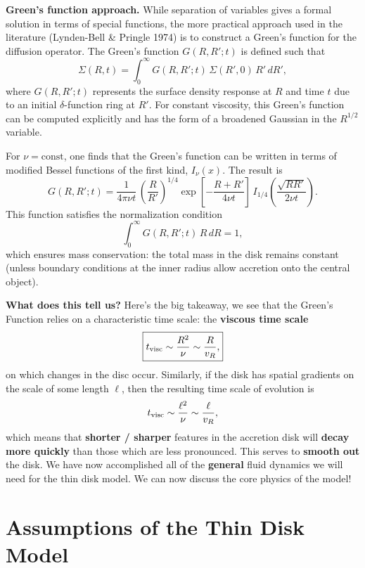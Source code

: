\vspace{0.25cm}
\noindent
\textbf{Green's function approach.} \;
While separation of variables gives a formal solution in terms of special functions, the more practical approach used in the literature (Lynden-Bell \& Pringle 1974) is to construct a Green's function for the diffusion operator. The Green's function $G(R,R';t)$ is defined such that
\[
\Sigma(R,t) = \int_0^\infty G(R,R';t)\,\Sigma(R',0)\, R'\,dR',
\]
where $G(R,R';t)$ represents the surface density response at $R$ and time $t$ due to an initial $\delta$-function ring at $R'$. For constant viscosity, this Green's function can be computed explicitly and has the form of a broadened Gaussian in the $R^{1/2}$ variable.
\par
For $\nu=\text{const}$, one finds that the Green's function can be written in terms of modified Bessel functions of the first kind, $I_\nu(x)$. The result is
\begin{equation}
    G(R,R';t) = \frac{1}{4\pi \nu t}\,
    \left(\frac{R}{R'}\right)^{1/4}
    \exp\!\left[-\frac{R+R'}{4\nu t}\right]\,
    I_{1/4}\!\left(\frac{\sqrt{RR'}}{2\nu t}\right).
\end{equation}
This function satisfies the normalization condition
\[
\int_0^\infty G(R,R';t)\,R\,dR = 1,
\]
which ensures mass conservation: the total mass in the disk remains constant (unless boundary conditions at the inner radius allow accretion onto the central object).
\par
\textbf{What does this tell us?}
Here's the big takeaway, we see that the Green's Function relies on a characteristic time scale: the \textbf{viscous time scale} 
\begin{equation}
    \label{eq:viscous_timescale}
    \boxed{
    t_{\rm visc} \sim \frac{R^2}{\nu} \sim \frac{R}{v_R},
    }
\end{equation}
on which changes in the disc occur. Similarly, if the disk has spatial gradients on the scale of some length $\ell$, then the resulting time scale of evolution is
\[
t_{\rm visc} \sim \frac{\ell^2}{\nu} \sim \frac{\ell}{v_R},
\]
which means that \textbf{shorter / sharper} features in the accretion disk will \textbf{decay more quickly} than those which are less pronounced. This serves to \textbf{smooth out} the disk. We have now accomplished all of the \textbf{general} fluid dynamics we will need for the thin disk model. We can now discuss the core physics of the model!

\newpage
\section{Assumptions of the Thin Disk Model}

